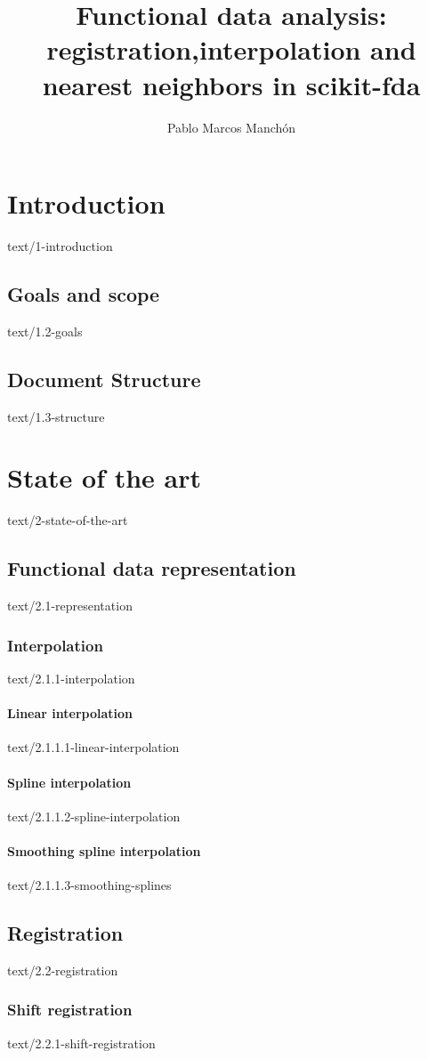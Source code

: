 \documentclass[epsbased,copyleft,final,loe, lof,extendedindex,firstnumbered,tfg,covers,english]{tfgtfmthesisuam}
\author{Pablo Marcos Manchón}
\title{Functional data analysis: registration,interpolation and nearest neighbors in scikit-fda}
\begin{document}
\chapter{Introduction\label{CAP:INTRODUCTION}}{text/1-introduction}
\section{Goals and scope\label{SEC:GOALS}}{text/1.2-goals}
\section{Document Structure\label{SEC:STRUCTURE}}{text/1.3-structure}


\chapter{State of the art\label{CAP:STATEOFART}}{text/2-state-of-the-art}

\section{Functional data representation\label{SEC:REPRESENTATION}}{text/2.1-representation}
  \subsection{Interpolation\label{SEC:INTERPOLATION}}{text/2.1.1-interpolation}
    \subsubsection{Linear interpolation\label{SSEC:LINEAR}}{text/2.1.1.1-linear-interpolation}
    \subsubsection{Spline interpolation\label{SSEC:SPLINES}}{text/2.1.1.2-spline-interpolation}
    \subsubsection{Smoothing spline interpolation\label{SSEC:SSPLINES}}{text/2.1.1.3-smoothing-splines}

\section{Registration\label{SEC:REGISTRATION}}{text/2.2-registration}
  \subsection{Shift registration\label{SEC:SHIFT}}{text/2.2.1-shift-registration}
\end{document}
